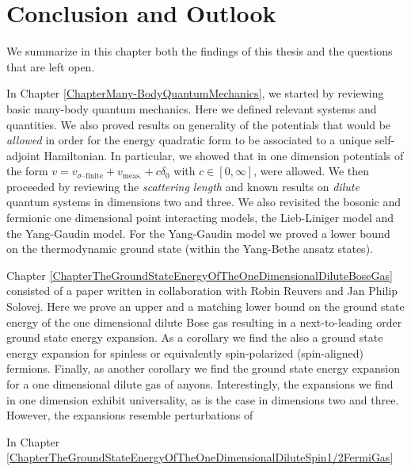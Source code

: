 \chapter{Conclusion and Outlook}
\label{ChapterConclusionAndOutlook}
We summarize in this chapter both the findings of this thesis and the questions that are left open.

In Chapter \ref{ChapterMany-BodyQuantumMechanics}, we started by reviewing basic many-body quantum mechanics. Here we defined relevant systems and quantities. We also proved results on generality of the potentials that would be \emph{allowed} in order for the energy quadratic form to be associated to a unique self-adjoint Hamiltonian. In particular, we showed that in one dimension potentials of the form $ v=v_{\sigma\text{--finite}}+v_{\text{meas.}} +c\delta_0 $ with $ c\in[0,\infty] $, were allowed. We then proceeded by reviewing the \emph{scattering length} and known results on \emph{dilute} quantum systems in dimensions two and three. We also revisited the bosonic and fermionic one dimensional point interacting models, \ie the Lieb-Liniger model and the Yang-Gaudin model.
For the Yang-Gaudin model we proved a lower bound on the thermodynamic ground state (within the Yang-Bethe ansatz states).

Chapter \ref{ChapterTheGroundStateEnergyOfTheOneDimensionalDiluteBoseGas} consisted of a paper written in collaboration with Robin Reuvers and Jan Philip Solovej. Here we prove an upper and a matching lower bound on the ground state energy of the one dimensional dilute Bose gas resulting in a next-to-leading order ground state energy expansion. As a corollary we find the also a ground state energy expansion for spinless or equivalently spin-polarized (spin-aligned) fermions. Finally, as  another corollary we find the ground state energy expansion for a one dimensional dilute gas of anyons. Interestingly, the expansions we find in one dimension exhibit universality, as is the case in dimensions two and three. However, the expansions resemble perturbations of 


In Chapter \ref{ChapterTheGroundStateEnergyOfTheOneDimensionalDiluteSpin1/2FermiGas}



